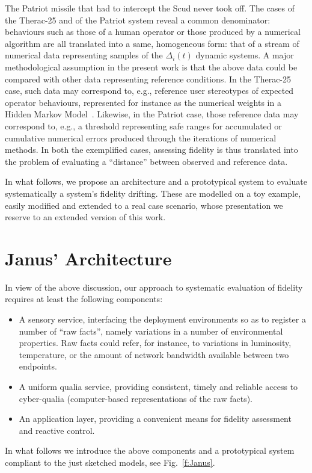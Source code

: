 \documentclass{article}
\begin{document}
The Patriot missile that had to intercept the Scud never took off. The cases of the Therac-25 and of the Patriot system reveal a common denominator: behaviours such as those of a human operator or those produced by a numerical algorithm are all translated into a same, homogeneous form: that of a stream of numerical data
representing samples of the $\Delta_i(t)$ dynamic systems. A major methodological assumption in the present work is that the above data could be compared with other data representing reference conditions. In the Therac-25 case, such data may correspond to, e.g., reference user stereotypes of expected operator behaviours, represented for instance as the numerical weights in a Hidden Markov Model~\cite{VD13}. Likewise, in the Patriot case, those reference data may correspond to, e.g.,
a threshold representing safe ranges for  accumulated or cumulative numerical errors produced through the iterations of numerical methods. In both the exemplified cases, assessing fidelity is thus translated into the problem of evaluating a ``distance'' between observed and reference data.










In what follows, we propose an architecture and a prototypical system to evaluate systematically a system's fidelity drifting. These are modelled on a toy example, easily modified and extended to a real case scenario, whose presentation we reserve to an extended version of this work.

\section{Janus' Architecture}\label{s:janus}

In view of the above discussion, our approach to systematic evaluation of fidelity requires at least the following
components:

\begin{itemize}
\item A sensory service, interfacing the deployment environments so as to register
a number of ``raw facts'', namely
variations in a number of environmental properties. Raw facts could refer, for instance, to variations
in luminosity, temperature, or the amount of network bandwidth available between two
endpoints.
\item A uniform qualia service, providing consistent, timely and reliable access to 
cyber-qualia (computer-based representations of the raw facts).
\item An application layer, providing a convenient means for fidelity assessment and reactive control.
\end{itemize}
In what follows we introduce the above components and a prototypical system
compliant to the just sketched models, see Fig.~\ref{f:Janus}.
\end{document}
